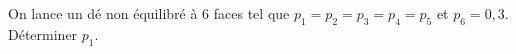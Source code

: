 
On lance un dé non équilibré à 6 faces tel que $p_1=p_2=p_3=p_4=p_5$ et $p_6=0,3$. Déterminer $p_1$.